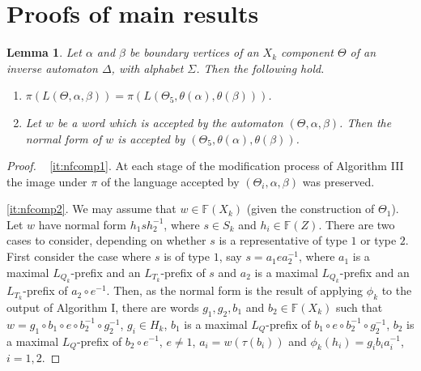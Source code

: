 \documentclass[a4paper,12pt]{article}
\renewcommand{\a}{\alpha }
\renewcommand{\b}{\beta }
\newcommand{\D}{\Delta }
\newcommand{\T}{\Theta }
\renewcommand{\S}{\Sigma }
\renewcommand{\t}{\tau }
\newtheorem{lemma}[theorem]{Lemma}
\numberwithin{equation}{section}
\numberwithin{figure}{section}
\newcommand{\FF}{\ensuremath{\mathbb{F}}}
\newcommand{\be}{\begin{enumerate}}
\newcommand{\ee}{\end{enumerate}}
\begin{document}
\section{Proofs of main results}\label{sec:proofs}
\begin{lemma}\label{lem:nfcomp}
Let $\a$ and $\b$ be boundary vertices of  an $X_k$ component $\T$ of
an inverse automaton $\D$, with alphabet $\S$. Then   the following hold.
\be
\item\label{it:nfcomp1}
  $\pi(L(\T,\a,\b))=\pi(L(\T_5,\theta(\a),\theta(\b)))$.
\item\label{it:nfcomp2} Let $w$ be a word
 which is accepted by the automaton $(\T, \a, \b)$. Then the
normal form of $w$ is accepted by $(\T_5, \theta(\a), \theta(\b))$.
\ee
\end{lemma}
\begin{proof} ~
\ref{it:nfcomp1}.
At each stage of the modification process of Algorithm
III the image under $\pi$ of the language accepted by $(\T_i,\a,\b)$  was
preserved.

\ref{it:nfcomp2}.
We may assume that $w\in \FF(X_k)$ (given the construction of $\T_1$).
Let $w$ have normal form $h_1s h_2^{-1}$, where $s\in S_k$ and $h_i\in \FF(Z)$.
There are two cases to consider, depending on whether $s$ is a
representative of type $1$ or type $2$.
 First consider the case where $s$ is of type $1$, say
 $s= a_1 e a_2^{-1}$, where
$a_1$ is a maximal $L_{Q_k}$-prefix and an $L_{T_k}$-prefix of $s$ and
 $a_2$  is a maximal $L_{Q_k}$-prefix and an $L_{T_k}$-prefix of $a_2\circ e^{-1}$.
 Then, as the normal form is the result of applying $\phi_k$ to the
output of Algorithm I,
 there are words
$g_1, g_2, b_1$ and $b_2\in \FF(X_k)$ such that
$w=g_1\circ b_1\circ e \circ b_2^{-1}\circ g_2^{-1}$,
$g_i\in H_k$, $b_1$ is a maximal $L_Q$-prefix of
$b_1\circ e \circ b_2^{-1}\circ g_2^{-1}$,
$b_2$ is a maximal $L_Q$-prefix of $b_2\circ e^{-1}$, $e\neq 1$,
$a_i=w(\t(b_i))$ and $\phi_k(h_i)=g_ib_ia_i^{-1}$, $i=1,2$.


\end{proof}
\end{document}
